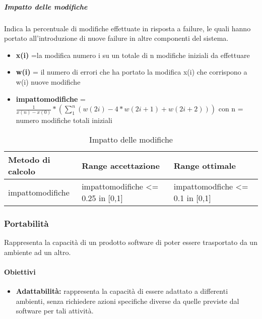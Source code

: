 			
			\subparagraph{Impatto delle modifiche}
			Indica la percentuale di modifiche effettuate in risposta a failure, le quali hanno portato all’introduzione di nuove failure in altre componenti del sistema.
			
			\begin{itemize}
				\item \textbf{x(i)} =la modifica numero i su un totale di n modifiche iniziali da effettuare
				\item \textbf{w(i)} = il numero di errori che ha portato la modifica x(i) che corrispono a w(i) nuove modifiche
				\item \textbf{impattomodifiche} = \begin{math}
				\frac{1}{x(n)-x(0)}*(\sum_{1}^{n}(w(2i) - 4*w(2i+1) + w(2i+2))) 
				\end{math} con n = numero modifiche totali iniziali
			\end{itemize}
			
			\begin{table}[H]
				\begin{longtable}{>{\centering\arraybackslash}p{5cm}|>{\centering\arraybackslash}p{5cm} | >{\centering\arraybackslash}p{5cm}}
					\hline
					\rowcolor{Gray}
					\textbf{Metodo di calcolo} & \textbf{Range accettazione} & \textbf{Range ottimale} \\
					\hline
					impattomodifiche &impattomodifiche <= 0.25 in [0,1] & impattomodfiche <= 0.1 in [0,1]
				\end{longtable}
				\caption{Impatto delle modifiche}
			\end{table}
			
		
	
	\subsubsection{Portabilità}
	Rappresenta la capacità di un prodotto software di poter essere trasportato da un ambiente ad un altro.
		
		\paragraph{Obiettivi}
			\begin{itemize}
				\item \textbf{Adattabilità:} rappresenta la capacità di essere adattato a differenti ambienti, senza richiedere azioni specifiche diverse da quelle previste dal software per tali attività.
			\end{itemize}
		
